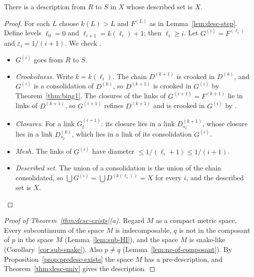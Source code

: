 
\begin{theorem}\label{thm:desc-univ}
There is a description from $R$ to $S$ in $X$ whose described set is $X$.
\end{theorem}

\begin{proof}
For each $L$ choose $k(L)>L$ and $F^{(L)}$ as in Lemma~\ref{lem:desc-step}. Define levels $\ell_0=0$ and $\ell_{i+1}=k(\ell_i)+1$; then
$\ell_i\ge i$. Let $G^{(i)}=F^{(\ell_i)}$ and $\varepsilon_i=1/(i+1)$. We check .
\begin{itemize}
\item $G^{(i)}$ goes from $R$ to $S$.
\item \emph{Crookedness.} Write $k=k(\ell_i)$. The chain $D^{(k+1)}$ is crooked in $D^{(k)}$, and $G^{(i)}$ is a consolidation of $D^{(k)}$,
so $D^{(k+1)}$ is crooked in $G^{(i)}$ by Theorem~\ref{thm:bing1}. The closures of the links of $G^{(i+1)}=F^{(k+1)}$ lie in links of
$D^{(k+1)}$, so $G^{(i+1)}$ refines $D^{(k+1)}$ and is crooked in $G^{(i)}$ by .
\item \emph{Closures.} For a link $G^{(i+1)}_t$: its closure lies in a link $D^{(k+1)}_{s_1}$, whose closure lies in a link $D^{(k)}_{s_2}$,
which lies in a link of its consolidation $G^{(i)}$.
\item \emph{Mesh.} The links of $G^{(i)}$ have diameter $\le1/(\ell_i+1)\le1/(i+1)$.
\item \emph{Described set.} The union of a consolidation is the union of the chain consolidated, so $\bigcup G^{(i)}=\bigcup D^{(k(\ell_i))}=X$
for every $i$, and the described set is $X$.\qedhere
\end{itemize}
\end{proof}


\begin{proof}[Proof of Theorem~\ref{thm:desc-exists}(a)]
Regard $M$ as a compact metric space. Every subcontinuum of the space $M$ is indecomposable, $q$ is not in the composant of $p$ in the space
$M$ (Lemma~\ref{lem:sub-HI}), and the space $M$ is snake-like (Corollary~\ref{cor:sub-snake}). Also $p\ne q$ (Lemma~\ref{lem:ne-of-composant}).
By Proposition~\ref{prop:predesc-exists} the space $M$ has a pre-description, and Theorem~\ref{thm:desc-univ} gives the description.
\end{proof}

